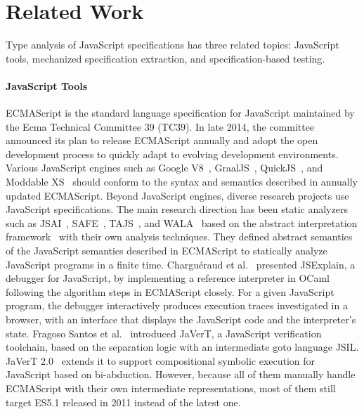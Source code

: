 \section{Related Work}\label{sec:related}

Type analysis of JavaScript specifications has three related topics:
JavaScript tools, mechanized specification extraction, and specification-based testing.

\paragraph{JavaScript Tools}
ECMAScript is the standard language specification for JavaScript maintained by
the Ecma Technical Committee 39 (TC39).  In late 2014, the committee announced
its plan to release ECMAScript annually and adopt the open development process
to quickly adapt to evolving development environments.  Various JavaScript engines such
as Google V8~\cite{v8}, GraalJS~\cite{graaljs}, QuickJS~\cite{qjs}, and Moddable
XS~\cite{moddable} should conform to the syntax and semantics described in
annually updated ECMAScript.  Beyond JavaScript engines, diverse
research projects use JavaScript specifications.  The main research direction
has been static analyzers such as JSAI~\cite{jsai}, SAFE~\cite{safe},
TAJS~\cite{tajs}, and WALA~\cite{wala} based on the abstract interpretation
framework~\cite{ai1977, ai1992} with their own analysis techniques.
They defined abstract semantics of the JavaScript semantics described in ECMAScript to statically
analyze JavaScript programs in a finite time.
Chargu{\'e}raud et al.~\cite{jsexplain} presented JSExplain, a debugger for JavaScript, by
implementing a reference interpreter in OCaml following the algorithm steps in ECMAScript closely.
For a given JavaScript program, the debugger interactively produces execution traces
investigated in a browser, with an interface that displays the
JavaScript code and the interpreter's state.
Fragoso Santos et al.~\cite{javert} introduced JaVerT, a JavaScript verification toolchain, based
on the separation logic with an intermediate goto language JSIL.
JaVerT 2.0~\cite{javert2} extends it to support compositional symbolic execution
for JavaScript based on bi-abduction.  However, because all of them manually handle
ECMAScript with their own intermediate representations, most of them still 
target ES5.1 released in 2011 instead of the latest one.

